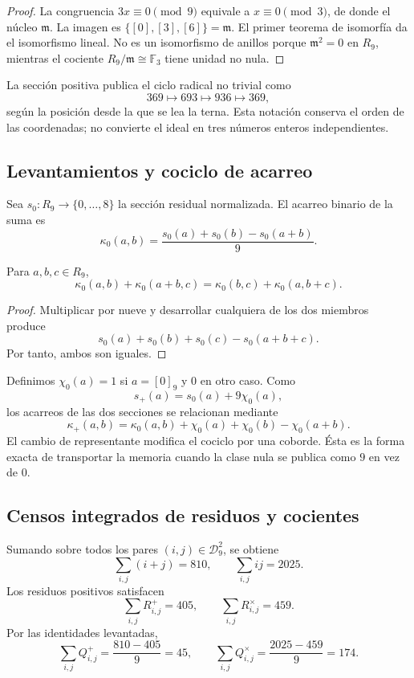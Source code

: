 \begin{proof}
La congruencia \(3x\equiv0\pmod9\) equivale a \(x\equiv0\pmod3\), de
donde el núcleo \(\mathfrak m\). La imagen es
\(\{[0],[3],[6]\}=\mathfrak m\). El primer teorema de isomorfía da el
isomorfismo lineal. No es un isomorfismo de anillos porque
\(\mathfrak m^2=0\) en \(R_9\), mientras el cociente
\(R_9/\mathfrak m\cong\mathbb F_3\) tiene unidad no nula.
\end{proof}

La sección positiva publica el ciclo radical no trivial como
\[
 369\longmapsto693\longmapsto936\longmapsto369,
\]
según la posición desde la que se lea la terna. Esta notación conserva el
orden de las coordenadas; no convierte el ideal en tres números enteros
independientes.

\subsection{Levantamientos y cociclo de acarreo}

Sea \(s_0:R_9\to\{0,\ldots,8\}\) la sección residual normalizada. El
acarreo binario de la suma es
\[
 \kappa_0(a,b)
 =\frac{s_0(a)+s_0(b)-s_0(a+b)}9.
\]

\begin{lemma}
\label{p12-83-c1-s1:lem:app-identidad-cociclo-acarreo}
Para \(a,b,c\in R_9\),
\[
 \kappa_0(a,b)+\kappa_0(a+b,c)
 =\kappa_0(b,c)+\kappa_0(a,b+c).
\]
\end{lemma}

\begin{proof}
Multiplicar por nueve y desarrollar cualquiera de los dos miembros produce
\[
 s_0(a)+s_0(b)+s_0(c)-s_0(a+b+c).
\]
Por tanto, ambos son iguales.
\end{proof}

Definimos \(\chi_0(a)=1\) si \(a=[0]_9\) y \(0\) en otro caso. Como
\[
 s_+(a)=s_0(a)+9\chi_0(a),
\]
los acarreos de las dos secciones se relacionan mediante
\[
 \kappa_+(a,b)=
 \kappa_0(a,b)+\chi_0(a)+\chi_0(b)-\chi_0(a+b).
\]
El cambio de representante modifica el cociclo por una coborde. Ésta es la
forma exacta de transportar la memoria cuando la clase nula se publica como
\(9\) en vez de \(0\).

\subsection{Censos integrados de residuos y cocientes}

Sumando sobre todos los pares \((i,j)\in\mathcal D_9^2\), se obtiene
\[
 \sum_{i,j}(i+j)=810,
 \qquad
 \sum_{i,j}ij=2025.
\]
Los residuos positivos satisfacen
\[
 \sum_{i,j}R^+_{i,j}=405,
 \qquad
 \sum_{i,j}R^\times_{i,j}=459.
\]
Por las identidades levantadas,
\[
 \sum_{i,j}Q^+_{i,j}=\frac{810-405}{9}=45,
 \qquad
 \sum_{i,j}Q^\times_{i,j}=\frac{2025-459}{9}=174.
\]

